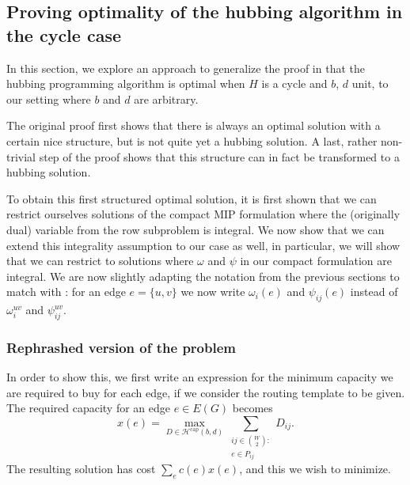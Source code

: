 \subsection{Proving optimality of the hubbing algorithm in the cycle case}
In this section, we explore an approach to generalize the proof in \cite{bosman2017exploring} that the hubbing programming algorithm is optimal when $H$ is a cycle and $b$, $d$ unit, to our setting where $b$ and $d$ are arbitrary.

The original proof first shows that there is always an optimal solution with a certain nice structure, but is not quite yet a hubbing solution.
A last, rather non-trivial step of the proof shows that this structure can in fact be transformed to a hubbing solution.


To obtain this first structured optimal solution, it is first shown that we can restrict ourselves solutions of the compact MIP formulation where the (originally dual) variable from the row subproblem is integral.
We now show that we can extend this integrality assumption to our case as well, in particular, we will show that we can restrict to solutions where $\omega$ and $\psi$ in our compact formulation are integral.
We are now slightly adapting the notation from the previous sections to match with \cite{bosman2017exploring}: for an edge $e = \{u, v\}$ we now write $\omega_i(e)$ and $\psi_{ij}(e)$ instead of $\omega_i^{uv}$ and $\psi_{ij}^{uv}$.

\subsubsection{Rephrashed version of the problem}
In order to show this, we first write an expression for the minimum capacity we are required to buy for each edge, if we consider the routing template to be given.
The required capacity for an edge $e \in E(G)$ becomes
\[
    x(e) = \max_{D \in \mathcal H^\text{cap}(b, d)} \sum_{\substack{ij \in \binom W 2 :\\e \in P_{ij}}} D_{ij}.
\]
The resulting solution has cost $\sum_e c(e) x(e)$, and this we wish to minimize.

